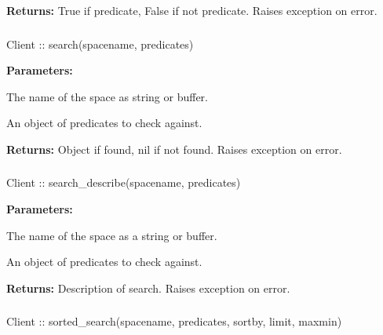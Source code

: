 \noindent\textbf{Returns:}
True if predicate, False if not predicate.  Raises exception on error.

\subsubsection{}
\label{api:nodejs:search}
\begin{javascriptcode}
Client :: search(spacename, predicates)
\end{javascriptcode}


\noindent\textbf{Parameters:}
\begin{description}[labelindent=\widthof{{\code{predicates}}},leftmargin=*,noitemsep,nolistsep,align=right]
\item[\code{spacename}] The name of the space as string or buffer.
\item[\code{predicates}] An object of predicates to check against.
\end{description}

\noindent\textbf{Returns:}
Object if found, nil if not found.  Raises exception on error.

\subsubsection{}
\label{api:nodejs:search_describe}
\begin{javascriptcode}
Client :: search_describe(spacename, predicates)
\end{javascriptcode}


\noindent\textbf{Parameters:}
\begin{description}[labelindent=\widthof{{\code{predicates}}},leftmargin=*,noitemsep,nolistsep,align=right]
\item[\code{spacename}] The name of the space as a string or buffer.
\item[\code{predicates}] An object of predicates to check against.
\end{description}

\noindent\textbf{Returns:}
Description of search.  Raises exception on error.

\subsubsection{}
\label{api:nodejs:sorted_search}
\begin{javascriptcode}
Client :: sorted_search(spacename, predicates, sortby, limit, maxmin)
\end{javascriptcode}


